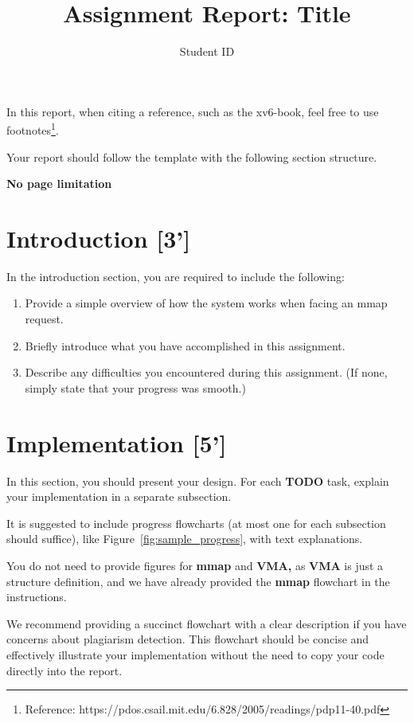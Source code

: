 \documentclass{article}
\title{Assignment Report: Title}
\author{Student ID}
\begin{document}
\maketitle

In this report, when citing a reference, such as the xv6-book, feel free to use footnotes\footnote{Reference: https://pdos.csail.mit.edu/6.828/2005/readings/pdp11-40.pdf}.

Your report should follow the template with the following section structure.

\textbf{No page limitation}

\section{Introduction [3']}

In the introduction section, you are required to include the following:
\begin{enumerate}
    \item Provide a simple overview of how the system works when facing an mmap request.
    \item Briefly introduce what you have accomplished in this assignment.
    \item Describe any difficulties you encountered during this assignment. (If none, simply state that your progress was smooth.)
\end{enumerate}

\section{Implementation [5']}

In this section, you should present your design. For each \textbf{TODO} task, explain your implementation in a separate subsection.

It is suggested to include progress flowcharts (at most one for each subsection should suffice), like Figure~\ref{fig:sample_progress}, with text explanations.

You do not need to provide figures for \textbf{mmap} and \textbf{VMA,} as \textbf{VMA} is just a structure definition, and we have already provided the \textbf{mmap} flowchart in the instructions.

We recommend providing a succinct flowchart with a clear description if you have concerns about plagiarism detection. This flowchart should be concise and effectively illustrate your implementation without the need to copy your code directly into the report.
\end{document}
